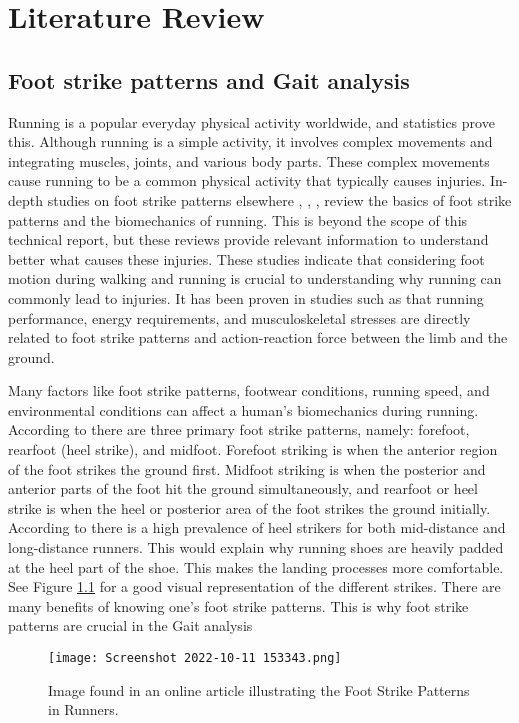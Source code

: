 \graphicspath{{litreview/fig/}}

\chapter{Literature Review}
\label{chap:litreview}
\section{Foot strike patterns and Gait analysis}
\label{sec:Gait}
Running is a popular everyday physical activity worldwide, and statistics prove this\cite{statistaresearchdepartment2020}. Although running is a simple activity, it involves complex movements and integrating muscles, joints, and various body parts. These complex movements cause running to be a common physical activity that typically causes injuries. In-depth studies on foot strike patterns elsewhere \cite{doi:10.2519/jospt.2015.6019}, \cite{CAVANAGH1980397
}, \cite{matheuso.almeidaptphdirenes.davisptphdalexandred.lopesptphd2015}, \cite{lauram.andersondanielr.bonannoharvif.hart&christianj.barton2020} review the basics of foot strike patterns and the biomechanics of running. This is beyond the scope of this technical report, but these reviews provide relevant information to understand better what causes these injuries. These studies indicate that considering foot motion during walking and running is crucial to understanding why running can commonly lead to injuries. It has been proven in studies such as \cite{kennethp.clarklaurencej.ryanpeterg.weyand2014} that running performance, energy requirements, and musculoskeletal stresses are directly related to foot strike patterns and action-reaction force between the limb and the ground. 

Many factors like foot strike patterns, footwear conditions, running speed, and environmental conditions can affect a human's biomechanics during running. According to \cite{matheuso.almeidaptphdirenes.davisptphdalexandred.lopesptphd2015} there are three primary foot strike patterns, namely: forefoot, rearfoot (heel strike), and midfoot. Forefoot striking is when the anterior region of the foot strikes the ground first. Midfoot striking is when the posterior and anterior parts of the foot hit the ground simultaneously, and rearfoot or heel strike is when the heel or posterior area of the foot strikes the ground initially. According to \cite{marEfootstrike} \cite{matheuso.almeidaptphdirenes.davisptphdalexandred.lopesptphd2015} there is a high prevalence of heel strikers for both mid-distance and long-distance runners. This would explain why running shoes are heavily padded at the heel part of the shoe. This makes the landing processes more comfortable. See Figure \ref{fig:footstrike} for a good visual representation of the different strikes. There are many benefits of knowing one's foot strike patterns. This is why foot strike patterns are crucial in the Gait analysis
\clearpage
\begin{figure}[!htb]
    \centering
    \texttt{[image: Screenshot 2022-10-11 153343.png]}
    \caption{Image found in an online article\cite{mass4d2017} illustrating the Foot Strike Patterns in Runners.}
    \label{fig:footstrike}
\end{figure}

